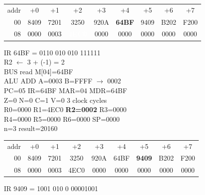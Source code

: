 \begin{tcolorbox}[stepbox, title={Step 29 \hfill PC 03 \quad ST R1, result}]
{\begin{tabular}{@{}r*{8}{c}@{}}
\textcolor{dim}{addr} & \textcolor{dim}{+0} & \textcolor{dim}{+1} & \textcolor{dim}{+2} & \textcolor{dim}{+3} & \textcolor{dim}{+4} & \textcolor{dim}{+5} & \textcolor{dim}{+6} & \textcolor{dim}{+7}\\
\textcolor{dim}{00} & 8409 & 7201 & 3250 & 920A & \cellcolor{pcc}\textbf{64BF} & 9409 & B202 & F200\\
\textcolor{dim}{08} & 0000 & \cellcolor{datac}0003 & \cellcolor{wrt}\textcolor{white}{\textbf{4EC0}} & 0000 & 0000 & 0000 & 0000 & 0000\\
\end{tabular}}
\end{tcolorbox}\par\vspace{3pt}
\noindent\begin{tcolorbox}[stepbox, title={Step 30 \hfill PC 04 \quad ADDI R2, R2, -1}]
\textcolor{dim}{IR} 64BF = 0110 010 010 111111\\
R2 $\leftarrow$ 3 + (-1) = 2\\
\textcolor{dim}{BUS} read M[04]=64BF\\
\textcolor{dim}{ALU} ADD A=0003 B=FFFF $\rightarrow$ 0002\\
PC=05 IR=64BF MAR=04 MDR=64BF\\
Z=0 N=0 C=1 V=0 \hfill \textcolor{dim}{3 clock cycles}\\
R0=0000 R1=4EC0 \textcolor{wrt}{\textbf{R2=0002}} R3=0000\\
R4=0000 R5=0000 R6=0000 SP=0000\\
\textcolor{dim}{n=3  result=20160}\\[1pt]
{\setlength{\tabcolsep}{1.6pt}\begin{tabular}{@{}r*{8}{c}@{}}
\textcolor{dim}{addr} & \textcolor{dim}{+0} & \textcolor{dim}{+1} & \textcolor{dim}{+2} & \textcolor{dim}{+3} & \textcolor{dim}{+4} & \textcolor{dim}{+5} & \textcolor{dim}{+6} & \textcolor{dim}{+7}\\
\textcolor{dim}{00} & 8409 & 7201 & 3250 & 920A & 64BF & \cellcolor{pcc}\textbf{9409} & B202 & F200\\
\textcolor{dim}{08} & 0000 & \cellcolor{datac}0003 & \cellcolor{datac}4EC0 & 0000 & 0000 & 0000 & 0000 & 0000\\
\end{tabular}}
\end{tcolorbox}\hfill\begin{tcolorbox}[stepbox, title={Step 31 \hfill PC 05 \quad ST R2, n}]
\textcolor{dim}{IR} 9409 = 1001 010 0 00001001\\

\end{tcolorbox}
